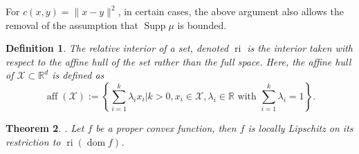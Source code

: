 \documentclass[11pt, oneside, titlepage]{book}
\theoremstyle{plain}
\newtheorem{theorem}{Theorem}[chapter]
\newtheorem{definition}[theorem]{Definition}
\theoremstyle{definition}
\newcommand{\R}{\mathbb{R}}
\newcommand{\X}{\mathcal{X}}
\DeclareMathOperator{\ri}{ri}
\DeclareMathOperator{\aff}{aff}
\DeclareMathOperator{\dom}{dom}
\DeclareMathOperator{\supp}{Supp}
\begin{document}
For $c(x, y) = \|x-y\|^2$, in certain cases, the above argument also allows the removal of the assumption that $\supp \mu$ is bounded.
\begin{definition}
 The relative interior of a set, denoted $\ri$ is the interior taken with respect to the affine hull of the set rather than the full space. Here, the affine hull of $\X \subset \R^d$ is defined as
 \begin{equation*}
     \aff(\X) :=\left\{ \sum_{i=1}^k \lambda_i x_i | k>0, x_i \in \X, \lambda_i \in \R \text{ with } \sum_{i=1}^k \lambda_i = 1\right\}.
 \end{equation*}
\end{definition}

\begin{theorem}\textnormal{\cite[Theorem 10.4]{rockafellar2015convex}.}
\label{thrm: rockafellar local lip}
    Let $f$ be a proper convex function, then $f$ is locally Lipschitz on its restriction to $\ri (\dom f)$.
\end{theorem}
\end{document}

